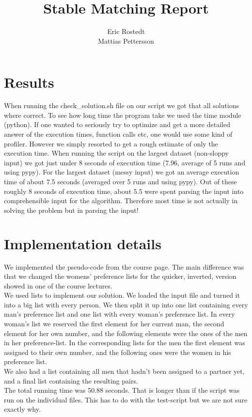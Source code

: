 \documentclass{article}
\title{Stable Matching Report}
\author{Eric Rostedt \\ Mattias Pettersson}
\begin{document}
  \maketitle

  \section{Results}

  
  When running the check\_solution.sh file on our script we got that all solutions where correct. To see how long time the program take we used the time module (python). If one wanted to seriously try to optimize and get a more detailed answer of the execution times, function calls etc, one would use some kind of profiler. However we simply resorted to get a rough estimate of only the execution time. When running the script on the largest dataset (non-sloppy input) we got just under 8 seconds of execution time (7.96, average of 5 runs and using pypy). For the largest dataset (messy input) we got an average execution time of about 7.5 seconds (averaged over 5 runs and using pypy). Out of these roughly 8 seconds of execution time, about 5.5 were spent parsing the input into comprehensible input for the algorithm. Therefore most time is not actually in solving the problem but in parsing the input!

  \section{Implementation details}

We implemented the pseudo-code from the course page. The main difference was that we changed the womens' preference lists for the quicker, inverted, version showed in one of the course lectures. \\

We used lists to implement our solution. We loaded the input file and turned it into a big list with every person. We then split it up into one list containing every man's preference list and one list with every woman's preference list. In every woman's list we reserved the first element for her current man, the second element for her own number, and the following elements were the ones of the men in her preference-list. In the corresponding lists for the men the first element was assigned to their own number, and the following ones were the women in his preference list.\\

We also had a list containing all men that hadn't been assigned to a partner yet, and a final list containing the resulting pairs.\\

The total running time was 50.88 seconds. That is longer than if the script was run on the individual files. This has to do with the test-script but we are not sure exactly why.
\end{document}
